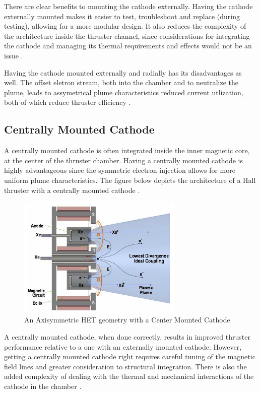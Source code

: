 There are clear benefits to mounting the cathode externally. Having the cathode externally mounted makes it easier to test, troubleshoot and replace (during testing), allowing for a more modular design. It also reduces the complexity of the architecture inside the thruster channel, since considerations for integrating the cathode and managing its thermal requirements and effects would not be an issue \cite{nasajpltext}.

Having the cathode mounted externally and radially has its disadvantages as well. The offset eletron stream, both into the chamber and to neutralize the plume, leads to assymetrical plume characteristics reduced current utlization, both of which reduce thruster efficiency \cite{nasajpltext}.

\subsection{Centrally Mounted Cathode}

A centrally mounted cathode is often integrated inside the inner magnetic core, at the center of the thruster chamber. Having a centrally mounted cathode is highly advantageous since the symmetric electron injection allows for more uniform plume characteristics. The figure below depicts the architecture of a Hall thruster with a centrally mounted cathode \cite{nasajpltext}. 

\begin{figure}[H]
    \centering
    \includegraphics[width=0.7\textwidth]{images/Concepts/CentralCathode.png}
    \captionsetup{justification=centering}
    \caption{An Axisymmetric \ac{HET} geometry with a Center Mounted Cathode \cite{CentralCathodePic}}
    \label{fig:center_mounter_cathode}
\end{figure}

A centrally mounted cathode, when done correctly, results in improved thruster performance relative to a one with an externally mounted cathode. However, getting a centrally mounted cathode right requires careful tuning of the magnetic field lines and greater consideration to structural integration. There is also the added complexity of dealing with the thermal and mechanical interactions of the cathode in the chamber \cite{nasajpltext}.

